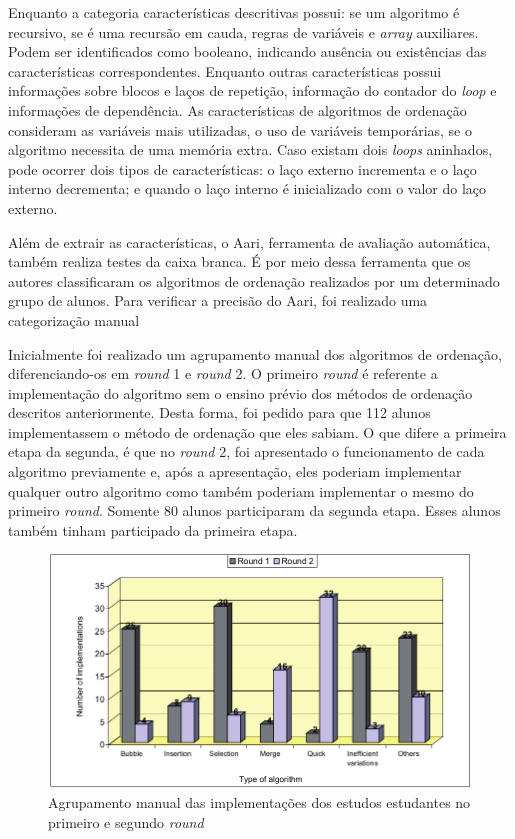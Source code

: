     Enquanto a categoria características descritivas possui: se um algoritmo é
    recursivo, se é uma recursão em cauda, regras de variáveis e \textit{array}
    auxiliares. Podem ser identificados como booleano, indicando ausência ou
    existências das características correspondentes. Enquanto outras características
    possui informações sobre blocos e laços de repetição, informação do contador do
    \textit{loop} e informações de dependência. As características de algoritmos de
    ordenação consideram as variáveis mais utilizadas, o uso de variáveis temporárias,
    se o algoritmo necessita de uma memória extra. Caso existam dois \textit{loops} aninhados,
    pode ocorrer dois tipos de características: o laço externo incrementa e o laço
    interno decrementa; e quando o laço interno é inicializado com o valor do laço
    externo. 
    
    Além de extrair as características, o Aari, ferramenta de avaliação automática,
    também realiza testes da caixa branca. É por meio dessa ferramenta que os
    autores classificaram os algoritmos de ordenação realizados por um determinado
    grupo de alunos. Para verificar a precisão do Aari, foi realizado uma
    categorização manual
    
    Inicialmente foi realizado um agrupamento manual dos algoritmos de ordenação,
    diferenciando-os em \textit{round} 1 e \textit{round} 2. O primeiro
    \textit{round} é referente a implementação do algoritmo sem o ensino
    prévio dos métodos de ordenação descritos anteriormente. Desta forma,
    foi pedido para que 112 alunos implementassem o método de ordenação que
    eles sabiam. O que difere a primeira etapa da segunda, é que no \textit{round}
    2, foi apresentado o funcionamento de cada algoritmo previamente e, após a
    apresentação, eles poderiam implementar qualquer outro algoritmo como também
    poderiam implementar o mesmo do primeiro \textit{round}. Somente 80 alunos
    participaram da segunda etapa. Esses alunos também tinham participado da
    primeira etapa.
    
    \begin{figure}[h]
        \centering
        \includegraphics[scale=0.4]{imagem/clusterManual.png}
        \caption{Agrupamento manual das implementações dos estudos estudantes no
        	primeiro e segundo \textit{round}}
        \label{fig:clusterManual}
    \end{figure}
    
